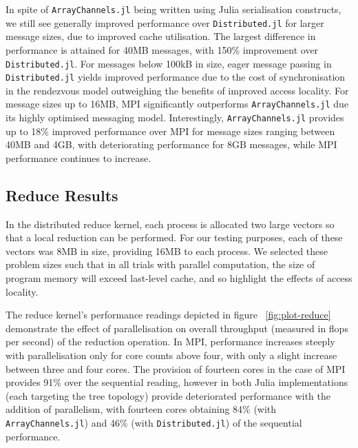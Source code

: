 \documentclass{juliacon}
\begin{document}
In spite of \texttt{ArrayChannels.jl} being written using Julia
serialisation constructs, we still see generally improved performance
over \texttt{Distributed.jl} for larger message sizes, due to improved
cache utilisation. The largest difference in performance is attained for
40MB messages, with 150\% improvement over \texttt{Distributed.jl}. For
messages below 100kB in size, eager message passing in
\texttt{Distributed.jl} yields improved performance due to the cost of
synchronisation in the rendezvous model outweighing the benefits of
improved access locality. For message sizes up to 16MB, MPI
significantly outperforms \texttt{ArrayChannels.jl} due its highly
optimised messaging model. Interestingly, \texttt{ArrayChannels.jl}
provides up to 18\% improved performance over MPI for message sizes
ranging between 40MB and 4GB, with deteriorating performance for 8GB
messages, while MPI performance continues to increase.

\subsection{Reduce Results}
\label{sec:reduce-results}

In the distributed reduce kernel, each process is allocated two large
vectors so that a local reduction can be performed. For our testing
purposes, each of these vectors was 8MB in size, providing 16MB to each
process. We selected these problem sizes such that in all trials with
parallel computation, the size of program memory will exceed last-level
cache, and so highlight the effects of access locality.

The reduce kernel's performance readings depicted in figure
~\ref{fig:plot-reduce} demonstrate the effect of parallelisation on
overall throughput (measured in flops per second) of the reduction
operation. In MPI, performance increases steeply with parallelisation
only for core counts above four, with only a slight increase between
three and four cores. The provision of fourteen cores in the case of MPI
provides 91\% over the sequential reading, however in both Julia
implementations (each targeting the tree topology) provide deteriorated
performance with the addition of parallelism, with fourteen cores
obtaining 84\% (with \texttt{ArrayChannels.jl}) and 46\% (with
\texttt{Distributed.jl}) of the sequential performance.
\end{document}
